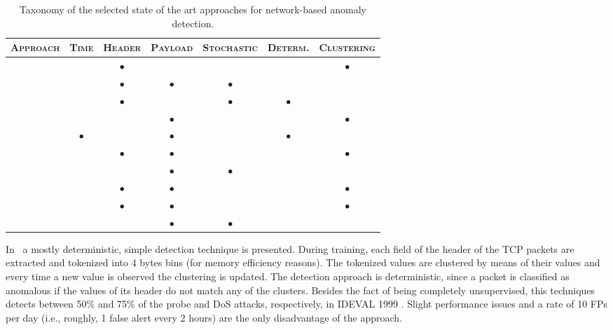 \begin{table}
  \renewcommand{\arraystretch}{1.5} \centering
  \begin{tabular}{rcccccc}
    \toprule \textsc{Approach} & \textsc{Time} & \textsc{Header} &
    \textsc{Payload} & \textsc{Stochastic} & \textsc{Determ.} &
    \textsc{Clustering}\\

    \midrule \citep{phad} & & $\bullet$ & & & &
    $\bullet$ \\

    \citep{kruegel:sac2002:anomaly} & & $\bullet$ &
    $\bullet$ & $\bullet$ & & \\

    \citep{protocolanom} & & $\bullet$ &
    & $\bullet$ & $\bullet$ & \\

    \citep{ramadas} & & & $\bullet$ & & &
    $\bullet$ \\

    \citep{rules-payl} & $\bullet$ & & $\bullet$ & &
    $\bullet$ & \\

    \citep{zanero-savaresi} & & $\bullet$ & $\bullet$ &
    & & $\bullet$ \\

    \citep{wang:raid2004:payl} & & & $\bullet$ &
    $\bullet$ & & \\

    \citep{zanero-pattern} & & $\bullet$ & $\bullet$
    & & & $\bullet$ \\

    \citep{DBLP:conf/iwia/BolzoniEHZ06} & & $\bullet$ & $\bullet$
    & & & $\bullet$ \\

    \citep{wang:raid2006:anagram} & & & $\bullet$ &
    $\bullet$ & & \\

 \bottomrule
  \end{tabular}
  \caption{Taxonomy of the selected state of the art approaches for
    network-based anomaly detection.}
  \label{tab:network-sota-taxonomy}
\end{table}

In~\citep{phad} a mostly deterministic, simple detection technique is
presented. During training, each field of the header of the \ac{TCP}
packets are extracted and tokenized into 4 bytes bins (for memory
efficiency reasons). The tokenized values are clustered by means of
their values and every time a new value is observed the clustering is
updated. The detection approach is deterministic, since a packet is
classified as anomalous if the values of its header do not match any
of the clusters. Besides the fact of being completely unsupervised,
this techniques detects between 50\% and 75\% of the probe and
\ac{DoS} attacks, respectively, in \ac{IDEVAL} 1999
\citep{ideval_1999_doc}. Slight performance issues and a rate of 10
\acp{FP} per day (i.e., roughly, 1 false alert every 2
hours) are the only disadvantage of the approach.

